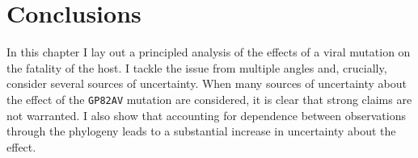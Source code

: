 \section{Conclusions}
\label{sec:conclusions}

In this chapter I lay out a principled analysis of the effects of a viral mutation on the fatality of the host.
I tackle the issue from multiple angles and, crucially, consider several sources of uncertainty.
When many sources of uncertainty about the effect of the \verb|GP82AV| mutation are considered, it is clear that strong claims are not warranted.
I also show that accounting for dependence between observations through the phylogeny leads to a substantial increase in uncertainty about the effect.

% 